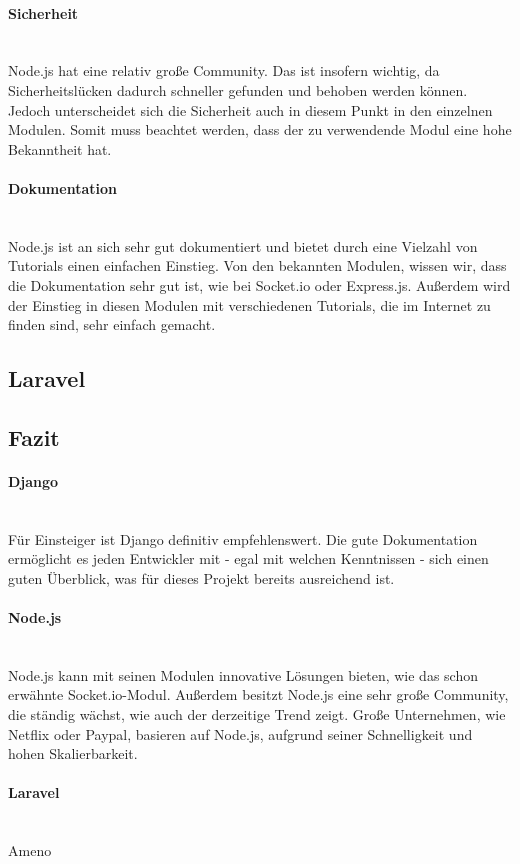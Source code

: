 \documentclass[11pt]{article}
\begin{document}
\paragraph{Sicherheit} \mbox{}\\
Node.js hat eine relativ große Community. Das ist insofern wichtig, da Sicherheitslücken dadurch schneller gefunden und behoben werden können. Jedoch unterscheidet sich die Sicherheit auch in diesem Punkt in den einzelnen Modulen. Somit muss beachtet werden, dass der zu verwendende Modul eine hohe Bekanntheit hat.

\paragraph{Dokumentation} \mbox{}\\
Node.js ist an sich sehr gut dokumentiert und bietet durch eine Vielzahl von Tutorials einen einfachen Einstieg. Von den bekannten Modulen, wissen wir, dass die Dokumentation sehr gut ist, wie bei Socket.io oder Express.js. Außerdem wird der Einstieg in diesen Modulen mit verschiedenen Tutorials, die im Internet zu finden sind, sehr einfach gemacht.

\subsection{Laravel}
\subsection{Fazit}
\paragraph{Django} \mbox{}\\
F\"ur Einsteiger ist Django definitiv empfehlenswert. Die gute Dokumentation erm\"oglicht es jeden Entwickler mit - egal mit welchen Kenntnissen - sich einen guten \"Uberblick, was f\"ur dieses Projekt bereits ausreichend ist.
\paragraph{Node.js} \mbox{}\\
Node.js kann mit seinen Modulen innovative Lösungen bieten, wie das schon erwähnte Socket.io-Modul. Außerdem besitzt Node.js eine sehr große Community, die ständig wächst, wie auch der derzeitige Trend zeigt. Große Unternehmen, wie Netflix oder Paypal, basieren auf Node.js, aufgrund seiner Schnelligkeit und hohen Skalierbarkeit.
\paragraph{Laravel} \mbox{}\\
Ameno
\\
\end{document}
